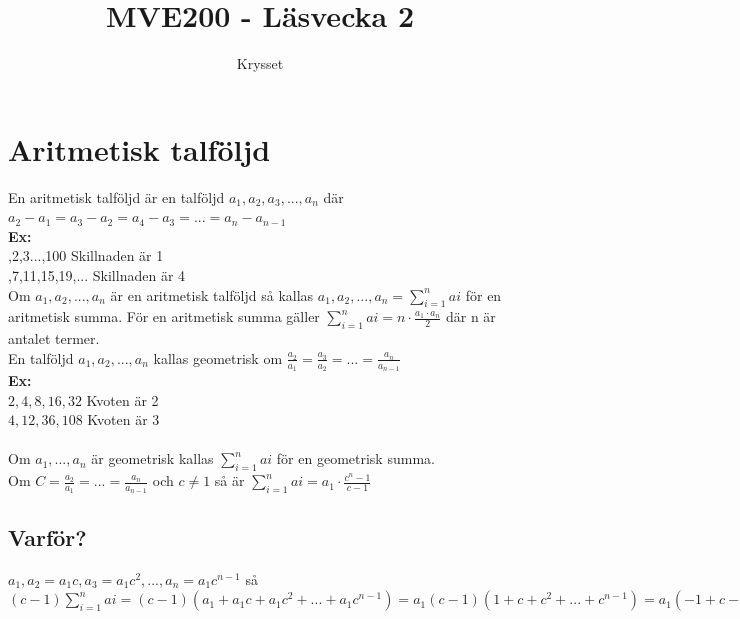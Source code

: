 \documentclass{article}
\title{MVE200 - Läsvecka 2}
\author{Krysset}
\begin{document}
    \tableofcontents
    \clearpage
    \section{Aritmetisk talföljd}
        En aritmetisk talföljd är en talföljd 
        $ a_{1}, a_{2}, a_{3}, ..., a_{n} $ där 
        $ a_{2}-a_{1} = a_{3} - a_{2} = a_{4} - a_{3} = ... = a_{n} - a_{n-1} $\\
        {\bf Ex:}\\
        ,2,3...,100 Skillnaden är 1\\
        ,7,11,15,19,... Skillnaden är 4\\
        Om $ a_{1}, a_{2}, ..., a_{n} $ är en aritmetisk talföljd så kallas 
        $ a_{1}, a_{2}, ..., a_{n} = \sum_{i = 1}^{n} ai$ för en aritmetisk summa. 
        För en aritmetisk summa gäller $ \sum_{i = 1}^{n} ai = n \cdot \frac{a_{1} \cdot a_{n}}{2} $ 
        där n är antalet termer.\\
        En talföljd $ a_{1}, a_{2}, ..., a_{n} $ kallas geometrisk om 
        $ \frac{a_{2}}{a_{1}} = \frac{a_{3}}{a_{2}} = ... = \frac{a_{n}}{a_{n-1}} $ \\
        {\bf Ex:}\\
        \indent $2,4,8,16,32$ Kvoten är 2\\
        \indent $4,12,36,108$ Kvoten är 3\\
        \\
        Om $a_{1},..., a_{n} $ är geometrisk kallas $ \sum_{i = 1}^{n} ai $ för en geometrisk summa.\\
        Om $ C = \frac{a_{2}}{a_{1}} = ... = \frac{a_{n}}{a_{n-1}} $ och $ c \neq 1 $ så är $ \sum_{i = 1}^{n} ai = a_{1} \cdot \frac{c^{n}-1}{c-1} $\\
        \subsection*{Varför?}
            $ a_{1}, a_{2} = a_{1}c, a_{3} = a_{1}c^{2}, ..., a_{n} = a_{1}c^{n-1} $ så 
            $ (c-1) \sum_{i = 1}^{n} ai = (c-1) (a_{1} + a_{1}c + a_{1}c^{2} +... + a_{1}c^{n-1})=
            a_{1}(c-1)(1+c+c^{2}+...+c^{n-1})=
            a_{1}(-1+c-c+c^{2}-c^{2}+...-...-c^{n-1}+c^{n})=
            a_{1}(c^{n}-1) $
    \clearpage
\end{document}
